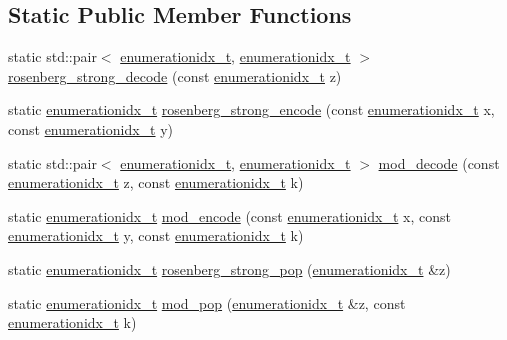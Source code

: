 \subsection*{Static Public Member Functions}
\begin{DoxyCompactItemize}
\item 
static std\+::pair$<$ \hyperlink{_integerized_stack_8h_a9fe2bbca873b046b2bd276fc6856bb88}{enumerationidx\+\_\+t}, \hyperlink{_integerized_stack_8h_a9fe2bbca873b046b2bd276fc6856bb88}{enumerationidx\+\_\+t} $>$ \hyperlink{class_integerized_stack_a63e9924cf38b166a112156669a141303}{rosenberg\+\_\+strong\+\_\+decode} (const \hyperlink{_integerized_stack_8h_a9fe2bbca873b046b2bd276fc6856bb88}{enumerationidx\+\_\+t} z)
\item 
static \hyperlink{_integerized_stack_8h_a9fe2bbca873b046b2bd276fc6856bb88}{enumerationidx\+\_\+t} \hyperlink{class_integerized_stack_a0e6ea0eed67030152c5808b9789dd625}{rosenberg\+\_\+strong\+\_\+encode} (const \hyperlink{_integerized_stack_8h_a9fe2bbca873b046b2bd276fc6856bb88}{enumerationidx\+\_\+t} x, const \hyperlink{_integerized_stack_8h_a9fe2bbca873b046b2bd276fc6856bb88}{enumerationidx\+\_\+t} y)
\item 
static std\+::pair$<$ \hyperlink{_integerized_stack_8h_a9fe2bbca873b046b2bd276fc6856bb88}{enumerationidx\+\_\+t}, \hyperlink{_integerized_stack_8h_a9fe2bbca873b046b2bd276fc6856bb88}{enumerationidx\+\_\+t} $>$ \hyperlink{class_integerized_stack_ab7c9b3bf6eb870bd7d74c624b3779cec}{mod\+\_\+decode} (const \hyperlink{_integerized_stack_8h_a9fe2bbca873b046b2bd276fc6856bb88}{enumerationidx\+\_\+t} z, const \hyperlink{_integerized_stack_8h_a9fe2bbca873b046b2bd276fc6856bb88}{enumerationidx\+\_\+t} k)
\item 
static \hyperlink{_integerized_stack_8h_a9fe2bbca873b046b2bd276fc6856bb88}{enumerationidx\+\_\+t} \hyperlink{class_integerized_stack_add34247b848e6601cbd55cccde98232a}{mod\+\_\+encode} (const \hyperlink{_integerized_stack_8h_a9fe2bbca873b046b2bd276fc6856bb88}{enumerationidx\+\_\+t} x, const \hyperlink{_integerized_stack_8h_a9fe2bbca873b046b2bd276fc6856bb88}{enumerationidx\+\_\+t} y, const \hyperlink{_integerized_stack_8h_a9fe2bbca873b046b2bd276fc6856bb88}{enumerationidx\+\_\+t} k)
\item 
static \hyperlink{_integerized_stack_8h_a9fe2bbca873b046b2bd276fc6856bb88}{enumerationidx\+\_\+t} \hyperlink{class_integerized_stack_afd7b3e942bcde5b794ec06cbbb6593c7}{rosenberg\+\_\+strong\+\_\+pop} (\hyperlink{_integerized_stack_8h_a9fe2bbca873b046b2bd276fc6856bb88}{enumerationidx\+\_\+t} \&z)
\item 
static \hyperlink{_integerized_stack_8h_a9fe2bbca873b046b2bd276fc6856bb88}{enumerationidx\+\_\+t} \hyperlink{class_integerized_stack_a07669571cd083803edb5a863c3c5419e}{mod\+\_\+pop} (\hyperlink{_integerized_stack_8h_a9fe2bbca873b046b2bd276fc6856bb88}{enumerationidx\+\_\+t} \&z, const \hyperlink{_integerized_stack_8h_a9fe2bbca873b046b2bd276fc6856bb88}{enumerationidx\+\_\+t} k)
\end{DoxyCompactItemize}
